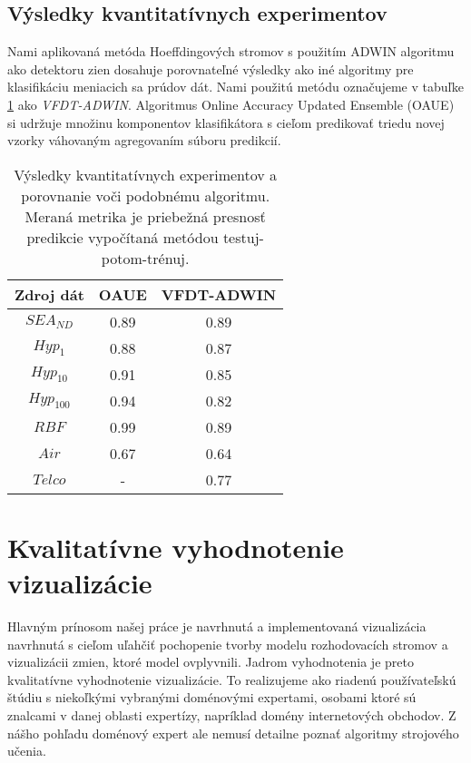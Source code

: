 \subsection{Výsledky kvantitatívnych experimentov}
Nami aplikovaná metóda Hoeffdingových stromov s použitím ADWIN algoritmu ako detektoru zien dosahuje porovnateľné výsledky ako iné algoritmy pre klasifikáciu meniacich sa prúdov dát. Nami použitú metódu označujeme v tabuľke \ref{tab-method-results} ako \textit{VFDT-ADWIN}. Algoritmus Online Accuracy Updated Ensemble (OAUE) \citep{brzezinski2014prequential} si udržuje množinu komponentov klasifikátora s cieľom predikovať triedu novej vzorky váhovaným agregovaním súboru predikcií.
\begin{table}[!htp]
\centering
\begin{tabular}{| c || c | c |}
\hline
\textbf{Zdroj dát} & \textbf{OAUE} & \textbf{VFDT-ADWIN} \\ \hline

$SEA_{ND}$ & 0.89 & 0.89 \\ \hline
$Hyp_1$ & 0.88 & 0.87 \\ \hline
$Hyp_{10}$ & 0.91 & 0.85 \\ \hline
$Hyp_{100}$ & 0.94 & 0.82 \\ \hline
$RBF$ & 0.99 & 0.89 \\ \hline
$Air$ & 0.67 & 0.64 \\ \hline
$Telco$ & - & 0.77 \\ \hline

\end{tabular}
\caption{Výsledky kvantitatívnych experimentov a porovnanie voči podobnému algoritmu. Meraná metrika je priebežná presnosť predikcie vypočítaná metódou testuj-potom-trénuj.}
\label{tab-method-results}
\end{table}



\section{Kvalitatívne vyhodnotenie vizualizácie}
Hlavným prínosom našej práce je navrhnutá a implementovaná vizualizácia navrhnutá s cieľom uľahčiť pochopenie tvorby modelu rozhodovacích stromov a vizualizácii zmien, ktoré model ovplyvnili. Jadrom vyhodnotenia je preto kvalitatívne vyhodnotenie vizualizácie. To realizujeme ako riadenú používateľskú štúdiu s niekoľkými vybranými doménovými expertami, osobami ktoré sú znalcami v danej oblasti expertízy, napríklad domény internetových obchodov. Z nášho pohľadu doménový expert ale nemusí detailne poznať algoritmy strojového učenia.

